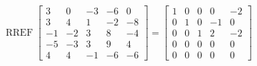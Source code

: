 \begin{exerciseAnswer} 


\[\operatorname{RREF} \left[\begin{array}{ccccc}
3 & 0 & -3 & -6 & 0 \\
3 & 4 & 1 & -2 & -8 \\
-1 & -2 & 3 & 8 & -4 \\
-5 & -3 & 3 & 9 & 4 \\
4 & 4 & -1 & -6 & -6
\end{array}\right] = \left[\begin{array}{ccccc}
1 & 0 & 0 & 0 & -2 \\
0 & 1 & 0 & -1 & 0 \\
0 & 0 & 1 & 2 & -2 \\
0 & 0 & 0 & 0 & 0 \\
0 & 0 & 0 & 0 & 0
\end{array}\right] \]



\end{exerciseAnswer}
